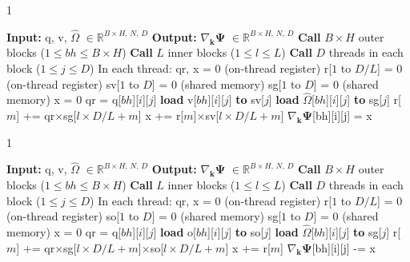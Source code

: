 \begin{algorithm}
\begin{spacing}{1}
  \caption{Backward-Pass, Alpha term}
  \label{alg3}
  \begin{algorithmic}[1] %
    \STATE \textbf{Input:} q, v, $\hat{\Omega}$ $\in \mathbb{R}^{B\times H,\,N,\,D}$
    \STATE \textbf{Output:} $\nabla_{\mathbf{k}}\mathbf{\Psi}$ $\in \mathbb{R}^{B\times H,\,N,\,D}$
    \STATE \textbf{Call} $B\times H$ outer blocks ($1\leq bh\leq B\times H$)
    \STATE \textbf{Call} $L$ inner blocks ($1\leq l\leq L$)
    \STATE \textbf{Call} $D$ threads in each block ($1\leq j\leq D$) 
    \STATE In each thread:
    \STATE qr, x = 0 (on-thread register)
    \STATE r[$1$ to $D/L$] = 0 (on-thread register)
    \STATE sv[$1$ to $D$] = 0 (shared memory)
    \STATE sg[$1$ to $D$] = 0 (shared memory)
        \STATE x = 0
        \STATE qr = q[$bh$][$i$][$j$]
        \STATE \textbf{load} v[$bh$][$i$][$j$] \textbf{to} sv[$j$]
        \STATE \textbf{load} $\hat{\Omega}$[$bh$][$i$][$j$] \textbf{to} sg[$j$]
           \STATE r[$m$] += qr$\times$sg[$l\times D/L + m$]
           \STATE x += r[$m$]$\times$sv[$l\times D/L + m$]
       \ENDFOR
       \STATE $\nabla_{\mathbf{k}}\mathbf{\Psi}$[bh][i][j] = x
    \ENDFOR
  \end{algorithmic}
  \end{spacing}
\end{algorithm}

\begin{algorithm}[!h]
\begin{spacing}{1}
  \caption{Backward-Pass, Beta term}
  \label{alg4}
  \begin{algorithmic}[1] %
    \STATE \textbf{Input:} q, v, $\hat{\Omega}$ $\in \mathbb{R}^{B\times H,\,N,\,D}$
    \STATE \textbf{Output:} $\nabla_{\mathbf{k}}\mathbf{\Psi}$ $\in \mathbb{R}^{B\times H,\,N,\,D}$
    \STATE \textbf{Call} $B\times H$ outer blocks ($1\leq bh\leq B\times H$)
    \STATE \textbf{Call} $L$ inner blocks ($1\leq l\leq L$)
    \STATE \textbf{Call} $D$ threads in each block ($1\leq j\leq D$) 
    \STATE In each thread:
    \STATE qr, x = 0 (on-thread register)
    \STATE r[$1$ to $D/L$] = 0 (on-thread register)
    \STATE so[$1$ to $D$] = 0 (shared memory)
    \STATE sg[$1$ to $D$] = 0 (shared memory)
        \STATE x = 0
        \STATE qr = q[$bh$][$i$][$j$]
        \STATE \textbf{load} o[$bh$][$i$][$j$] \textbf{to} so[$j$]
        \STATE \textbf{load} $\hat{\Omega}$[$bh$][$i$][$j$] \textbf{to} sg[$j$]
           \STATE r[$m$] += qr$\times$sg[$l\times D/L + m$]$\times$so[$l\times D/L + m$]
           \STATE x += r[$m$]
       \ENDFOR
       \STATE $\nabla_{\mathbf{k}}\mathbf{\Psi}$[bh][i][j] -= x
    \ENDFOR
  \end{algorithmic}
  \end{spacing}
\end{algorithm}

